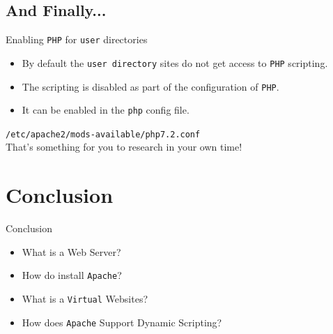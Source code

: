 \documentclass[xcolor=table]{beamer}
\begin{document}
\subsection{And Finally...}
\begin{frame}{Enabling \texttt{PHP} for \texttt{user} directories}
  \begin{itemize}
    \item By default the \texttt{user directory} sites do not get access to \texttt{PHP} scripting.
    \item The scripting is disabled as part of the configuration of \texttt{PHP}.
    \item It can be enabled in the \texttt{php} config file.
  \end{itemize}
  \begin{tcolorbox}
    \begin{center}
      \scriptsize \texttt{/etc/apache2/mods-available/php7.2.conf}\\
      That's something for you to research in your own time!
    \end{center}
  \end{tcolorbox}
\end{frame}

\section*{Conclusion}
\begin{frame}{Conclusion}
  \begin{itemize}
    \item What is a Web Server?
    \item How do install \texttt{Apache}?
    \item What is a \texttt{Virtual} Websites?
    \item How does \texttt{Apache} Support Dynamic Scripting?
  \end{itemize}
\end{frame}
\end{document}
